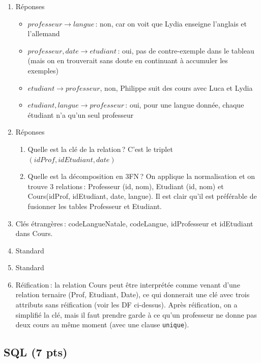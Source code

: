    
\begin{solution}
\begin{enumerate}
   \item Réponses
   \begin{itemize}
     \item $professeur \to langue$\,: non, car on voit que Lydia enseigne l'anglais et l'allemand
     \item   $professeur, date \to etudiant$\,: oui, pas de contre-exemple dans le tableau (mais on en trouverait sans doute en continuant à accumuler les exemples)
     \item $etudiant \to professeur$, non, Philippe suit des cours avec Luca et Lydia
     \item $etudiant, langue \to professeur$\,: oui, pour une langue donnée, chaque étudiant n'a qu'un seul professeur
   \end{itemize}

   \item Réponses
      \begin{enumerate}
        \item Quelle est la clé de la relation\,? C'est le triplet  $(idProf, idEtudiant, date)$
        \item Quelle est la décomposition en 3FN\,? On applique la 
        normalisation et on trouve 3 relations\,: Professeur (id, nom),
     Etudiant (id, nom) et Cours(idProf, idEtudiant, date, langue). 
     Il est clair qu'il est préférable de fusionner les tables Professeur et Etudiant.
        \end{enumerate}

  \item Clés étrangères\,: codeLangueNatale, codeLangue,
      idProfesseur et idEtudiant dans Cours.
   \item Standard
    \item Standard
  \item Réification\,: la relation Cours peut être interprétée comme
      venant d'une relation ternaire (Prof, Etudiant, Date), ce qui
      donnerait une clé avec trois attributs sans réification (voir les DF ci-dessus).
      Après réification, on a simplifié la clé, mais il faut prendre 
      garde à ce qu'un professeur ne donne pas deux cours au même
      moment (avec une clause \texttt{unique}). 
\end{enumerate}

\end{solution}


\subsection*{SQL (7 pts)}

